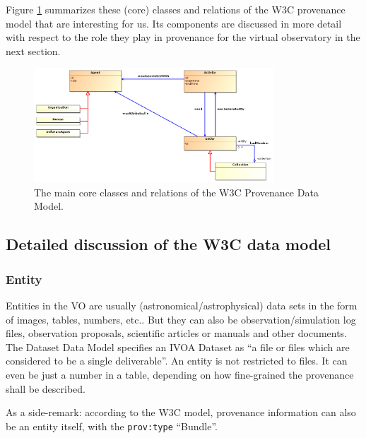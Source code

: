 Figure \ref{fig:w3cclasses} summarizes these (core) classes and relations of the W3C provenance model that are interesting for us.
Its components are discussed in more detail with respect to the role they play in provenance for the virtual observatory in the next section.

\begin{figure}
\centering
\includegraphics[width=0.8\textwidth]{ProvDM-W3C-classdiagram.png}
\caption{The main core classes and relations of the W3C Provenance Data Model.}
\label{fig:w3cclasses}
\end{figure}




\subsection{Detailed discussion of the W3C data model}

\subsubsection{Entity}
Entities in the VO are usually (astronomical/astrophysical) data sets in the form of images, tables, numbers, etc.. But they can also be observation/simulation log files, observation proposals, scientific articles or manuals and other documents. The Dataset Data Model \citep{std:DatasetDM} specifies an IVOA Dataset as ``a file or files which are considered to be a single deliverable''. An entity is not restricted to files. It can even be just a number in a table, depending on how fine-grained the provenance shall be described.

As a side-remark: according to the W3C model,  provenance information can also be an entity itself, with the \texttt{prov:type} ``Bundle''.

